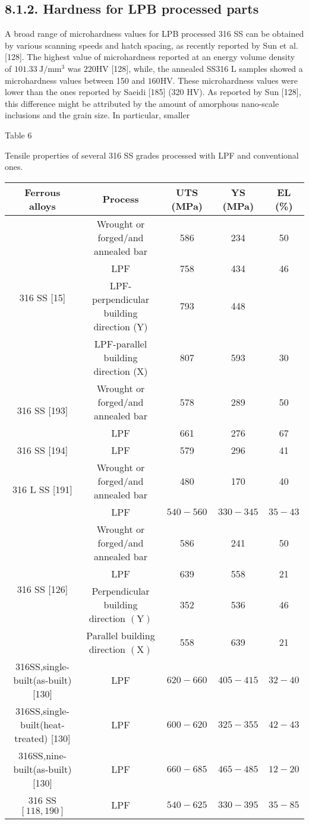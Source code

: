 \documentclass[10pt]{article}
\begin{document}
\subsection*{8.1.2. Hardness for LPB processed parts}
A broad range of microhardness values for LPB processed 316 SS can be obtained by various scanning speeds and hatch spacing, as recently reported by Sun et al. [128]. The highest value of microhardness reported at an energy volume density of $101.33 \mathrm{~J} / \mathrm{mm}^{3}$ was $220 \mathrm{HV}$ [128], while, the annealed SS316 L samples showed a microhardness values between 150 and $160 \mathrm{HV}$. These microhardness values were lower than the ones reported by Saeidi [185] (320 HV). As reported by Sun [128], this difference might be attributed by the amount of amorphous nano-scale inclusions and the grain size. In particular, smaller

Table 6

Tensile properties of several 316 SS grades processed with LPF and conventional ones.

\begin{center}
\begin{tabular}{|c|c|c|c|c|}
\hline
Ferrous alloys & Process & UTS (MPa) & YS (MPa) & EL (\%) \\
\hline
\multirow[t]{4}{*}{316 SS [15]} & Wrought or forged/and annealed bar & 586 & 234 & 50 \\
\hline
 & LPF & 758 & 434 & 46 \\
\hline
 & LPF-perpendicular building direction (Y) & 793 & 448 &  \\
\hline
 & LPF-parallel building direction (X) & 807 & 593 & 30 \\
\hline
\multirow[t]{2}{*}{316 SS [193]} & Wrought or forged/and annealed bar & 578 & 289 & 50 \\
\hline
 & LPF & 661 & 276 & 67 \\
\hline
316 SS [194] & LPF & 579 & 296 & 41 \\
\hline
\multirow[t]{2}{*}{316 L SS [191]} & Wrought or forged/and annealed bar & 480 & 170 & 40 \\
\hline
 & LPF & $540-560$ & $330-345$ & $35-43$ \\
\hline
\multirow[t]{4}{*}{316 SS [126]} & Wrought or forged/and annealed bar & 586 & 241 & 50 \\
\hline
 & LPF & 639 & 558 & 21 \\
\hline
 & Perpendicular building direction $(\mathrm{Y})$ & 352 & 536 & 46 \\
\hline
 & Parallel building direction $(\mathrm{X})$ & 558 & 639 & 21 \\
\hline
316SS,single-built(as-built) [130] & LPF & $620-660$ & $405-415$ & $32-40$ \\
\hline
316SS,single-built(heat-treated) [130] & LPF & $600-620$ & $325-355$ & $42-43$ \\
\hline
316SS,nine-built(as-built) [130] & LPF & $660-685$ & $465-485$ & $12-20$ \\
\hline
316 SS $[118,190]$ & LPF & $540-625$ & $330-395$ & $35-85$ \\
\hline
\end{tabular}
\end{center}
\end{document}
